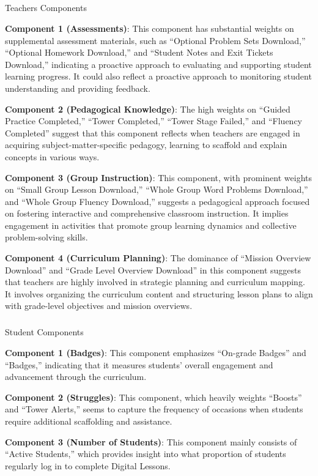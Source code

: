 \documentclass[
  number,
  preprint,
  3p,
  onecolumn]{elsarticle}
\makeatletter
\let\oldsubparagraph\subparagraph
\renewcommand{\subparagraph}{
    \@ifstar
      \xxxSubParagraphStar
      \xxxSubParagraphNoStar
  }
\newcommand{\xxxSubParagraphStar}[1]{\oldsubparagraph*{#1}\mbox{}}
\newcommand{\xxxSubParagraphNoStar}[1]{\oldsubparagraph{#1}\mbox{}}
\makeatother
\begin{document}
\subparagraph{Teachers Components}\label{teachers-components}

\textbf{Component 1 (Assessments)}: This component has substantial
weights on supplemental assessment materials, such as ``Optional Problem
Sets Download,'' ``Optional Homework Download,'' and ``Student Notes and
Exit Tickets Download,'' indicating a proactive approach to evaluating
and supporting student learning progress. It could also reflect a
proactive approach to monitoring student understanding and providing
feedback.

\textbf{Component 2 (Pedagogical Knowledge)}: The high weights on
``Guided Practice Completed,'' ``Tower Completed,'' ``Tower Stage
Failed,'' and ``Fluency Completed'' suggest that this component reflects
when teachers are engaged in acquiring subject-matter-specific pedagogy,
learning to scaffold and explain concepts in various ways.

\textbf{Component 3 (Group Instruction)}: This component, with prominent
weights on ``Small Group Lesson Download,'' ``Whole Group Word Problems
Download,'' and ``Whole Group Fluency Download,'' suggests a pedagogical
approach focused on fostering interactive and comprehensive classroom
instruction. It implies engagement in activities that promote group
learning dynamics and collective problem-solving skills.

\textbf{Component 4 (Curriculum Planning)}: The dominance of ``Mission
Overview Download'' and ``Grade Level Overview Download'' in this
component suggests that teachers are highly involved in strategic
planning and curriculum mapping. It involves organizing the curriculum
content and structuring lesson plans to align with grade-level
objectives and mission overviews.

\subparagraph{Student Components}\label{student-components}

\textbf{Component 1 (Badges)}: This component emphasizes ``On-grade
Badges'' and ``Badges,'' indicating that it measures students' overall
engagement and advancement through the curriculum.

\textbf{Component 2 (Struggles)}: This component, which heavily weights
``Boosts'' and ``Tower Alerts,'' seems to capture the frequency of
occasions when students require additional scaffolding and assistance.

\textbf{Component 3 (Number of Students)}: This component mainly
consists of ``Active Students,'' which provides insight into what
proportion of students regularly log in to complete Digital Lessons.
\end{document}
